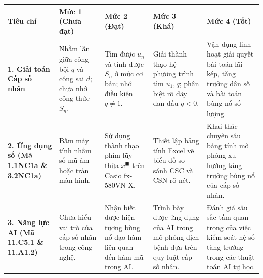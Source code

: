 \documentclass[12pt, a4paper]{article}
\begin{document}
\begin{center}
\begin{tabularx}{\linewidth}{|p{3.2cm}|X|X|X|X|}
\hline
\textbf{Tiêu chí} & \textbf{Mức 1 (Chưa đạt)} & \textbf{Mức 2 (Đạt)} & \textbf{Mức 3 (Khá)} & \textbf{Mức 4 (Tốt)} \\
\hline
\textbf{1. Giải toán Cấp số nhân} & Nhầm lẫn giữa công bội $q$ và công sai $d$; chưa nhớ công thức $S_n$. & Tìm được $u_n$ và tính được $S_n$ ở mức cơ bản; nhớ điều kiện $q \neq 1$. & Giải thành thạo hệ phương trình tìm $u_1, q$; phân biệt rõ dãy đan dấu $q < 0$. & Vận dụng linh hoạt giải quyết bài toán lãi kép, tăng trưởng dân số và bài toán bùng nổ số lượng. \\
\hline
\textbf{2. Ứng dụng số (Mã 1.1NC1a \& 3.2NC1a)} & Bấm máy tính nhầm số mũ âm hoặc tràn màn hình. & Sử dụng thành thạo phím lũy thừa $x^\blacksquare$ trên Casio fx-580VN X. & Thiết lập bảng tính Excel vẽ biểu đồ so sánh CSC và CSN rõ nét. & Khai thác chuyên sâu bảng tính mô phỏng xu hướng tăng trưởng bùng nổ của cấp số nhân. \\
\hline
\textbf{3. Năng lực AI (Mã 11.C5.1 \& 11.A1.2)} & Chưa hiểu vai trò của cấp số nhân trong công nghệ. & Nhận biết được hiện tượng bùng nổ đạo hàm liên quan đến hàm mũ trong AI. & Trình bày được ứng dụng của AI trong mô phỏng dịch bệnh dựa trên quy luật cấp số nhân. & Đánh giá sâu sắc tầm quan trọng của việc kiểm soát hệ số tăng trưởng trong các thuật toán AI tự học. \\
\hline
\end{tabularx}
\end{center}
\end{document}
